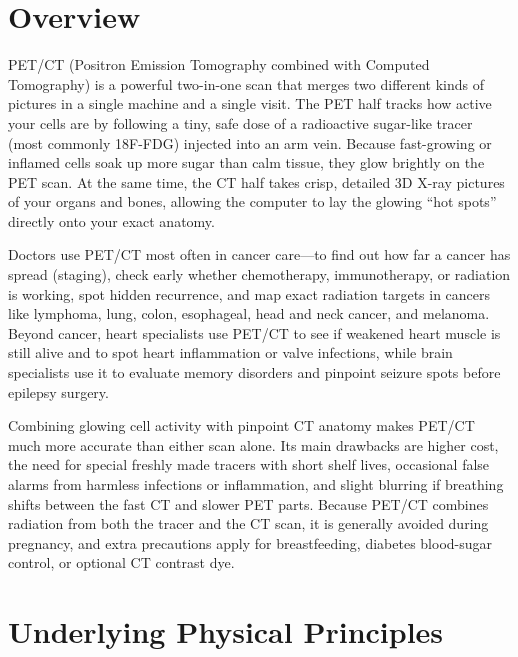 \label{ch:infographic-pet-ct}

\section{Overview}

PET/CT (Positron Emission Tomography combined with Computed Tomography) is a powerful two-in-one scan that merges two different kinds of pictures in a single machine and a single visit. The PET half tracks how active your cells are by following a tiny, safe dose of a radioactive sugar-like tracer (most commonly 18F-FDG) injected into an arm vein. Because fast-growing or inflamed cells soak up more sugar than calm tissue, they glow brightly on the PET scan. At the same time, the CT half takes crisp, detailed 3D X-ray pictures of your organs and bones, allowing the computer to lay the glowing ``hot spots'' directly onto your exact anatomy.

Doctors use PET/CT most often in cancer care---to find out how far a cancer has spread (staging), check early whether chemotherapy, immunotherapy, or radiation is working, spot hidden recurrence, and map exact radiation targets in cancers like lymphoma, lung, colon, esophageal, head and neck cancer, and melanoma. Beyond cancer, heart specialists use PET/CT to see if weakened heart muscle is still alive and to spot heart inflammation or valve infections, while brain specialists use it to evaluate memory disorders and pinpoint seizure spots before epilepsy surgery.

Combining glowing cell activity with pinpoint CT anatomy makes PET/CT much more accurate than either scan alone. Its main drawbacks are higher cost, the need for special freshly made tracers with short shelf lives, occasional false alarms from harmless infections or inflammation, and slight blurring if breathing shifts between the fast CT and slower PET parts. Because PET/CT combines radiation from both the tracer and the CT scan, it is generally avoided during pregnancy, and extra precautions apply for breastfeeding, diabetes blood-sugar control, or optional CT contrast dye.

\section{Underlying Physical Principles}

